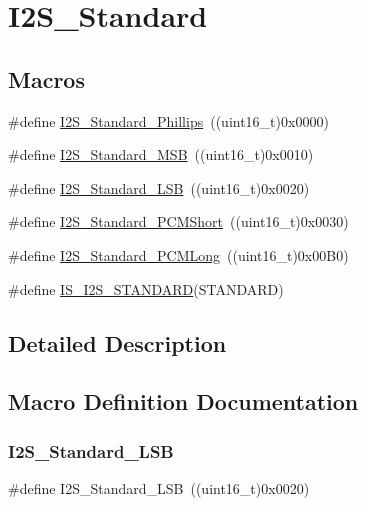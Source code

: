 \hypertarget{group___i2_s___standard}{}\section{I2\+S\+\_\+\+Standard}
\label{group___i2_s___standard}
\subsection*{Macros}
\begin{DoxyCompactItemize}
\item 
\#define \mbox{\hyperlink{group___i2_s___standard_gacdb89d66a2a941924ff4b7a8d14884f9}{I2\+S\+\_\+\+Standard\+\_\+\+Phillips}}~((uint16\+\_\+t)0x0000)
\item 
\#define \mbox{\hyperlink{group___i2_s___standard_gae716cfa7e031affc37fe65dd80b0e6f4}{I2\+S\+\_\+\+Standard\+\_\+\+M\+SB}}~((uint16\+\_\+t)0x0010)
\item 
\#define \mbox{\hyperlink{group___i2_s___standard_ga88bc9001a13b95a0844d81fea2080df6}{I2\+S\+\_\+\+Standard\+\_\+\+L\+SB}}~((uint16\+\_\+t)0x0020)
\item 
\#define \mbox{\hyperlink{group___i2_s___standard_gaaf59e587048ff632037dfc9875ab4c7b}{I2\+S\+\_\+\+Standard\+\_\+\+P\+C\+M\+Short}}~((uint16\+\_\+t)0x0030)
\item 
\#define \mbox{\hyperlink{group___i2_s___standard_gaf79cb88702059506d876dbd776d7a136}{I2\+S\+\_\+\+Standard\+\_\+\+P\+C\+M\+Long}}~((uint16\+\_\+t)0x00\+B0)
\item 
\#define \mbox{\hyperlink{group___i2_s___standard_ga826b9ddb34520b8fa64c2b65c9bfd528}{I\+S\+\_\+\+I2\+S\+\_\+\+S\+T\+A\+N\+D\+A\+RD}}(S\+T\+A\+N\+D\+A\+RD)
\end{DoxyCompactItemize}


\subsection{Detailed Description}


\subsection{Macro Definition Documentation}
\mbox{\label{group___i2_s___standard_ga88bc9001a13b95a0844d81fea2080df6}} 
\subsubsection{\texorpdfstring{I2S\_Standard\_LSB}{I2S\_Standard\_LSB}}
{\footnotesize\ttfamily \#define I2\+S\+\_\+\+Standard\+\_\+\+L\+SB~((uint16\+\_\+t)0x0020)}

